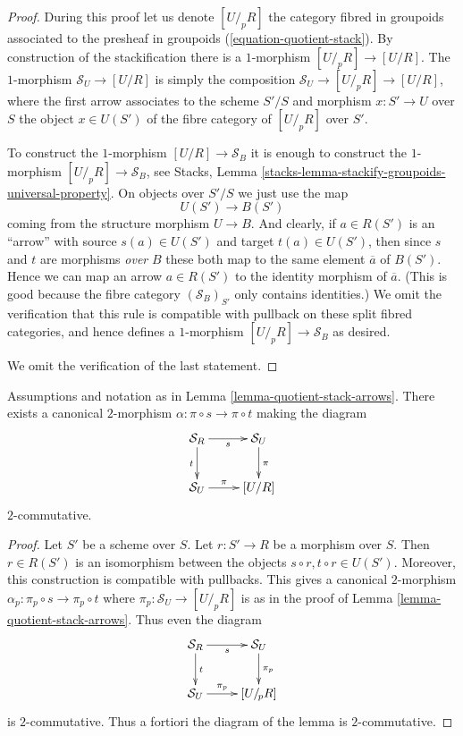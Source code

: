 \begin{proof}
During this proof let us denote $[U/_{\!p}R]$ the category fibred in
groupoids associated to the presheaf in groupoids
(\ref{equation-quotient-stack}). By construction of the stackification
there is a $1$-morphism $[U/_{\!p}R] \to [U/R]$.
The $1$-morphism $\mathcal{S}_U \to [U/R]$ is simply the composition
$\mathcal{S}_U \to [U/_{\!p}R] \to [U/R]$, where the first arrow
associates to the scheme $S'/S$ and morphism $x : S' \to U$ over $S$
the object $x \in U(S')$ of the fibre category of $[U/_{\!p}R]$
over $S'$.

\medskip\noindent
To construct the $1$-morphism $[U/R] \to \mathcal{S}_B$ it is enough to
construct the $1$-morphism $[U/_{\!p}R] \to \mathcal{S}_B$, see
Stacks, Lemma \ref{stacks-lemma-stackify-groupoids-universal-property}.
On objects over $S'/S$ we just use the map
$$
U(S') \longrightarrow B(S')
$$
coming from the structure morphism $U \to B$.
And clearly, if $a \in R(S')$ is an ``arrow'' with source
$s(a) \in U(S')$ and target $t(a) \in U(S')$, then since
$s$ and $t$ are morphisms {\it over} $B$ these both
map to the same element $\overline{a}$ of $B(S')$. Hence we can map an arrow
$a \in R(S')$ to the identity morphism of $\overline{a}$. (This is
good because the fibre category $(\mathcal{S}_B)_{S'}$ only contains
identities.) We omit the verification that this rule is compatible with
pullback on these split fibred categories, and hence defines a
$1$-morphism $[U/_{\!p}R] \to \mathcal{S}_B$ as desired.

\medskip\noindent
We omit the verification of the last statement.
\end{proof}

\begin{lemma}
\label{lemma-quotient-stack-2-arrow}
Assumptions and notation as in Lemma \ref{lemma-quotient-stack-arrows}.
There exists a canonical $2$-morphism
$\alpha : \pi \circ s \to \pi \circ t$ making the diagram
$$
\xymatrix{
\mathcal{S}_R \ar[r]_s \ar[d]_t & \mathcal{S}_U \ar[d]^\pi \\
\mathcal{S}_U \ar[r]^-\pi & [U/R]
}
$$
$2$-commutative.
\end{lemma}

\begin{proof}
Let $S'$ be a scheme over $S$. Let $r : S' \to R$ be a morphism over $S$.
Then $r \in R(S')$ is an isomorphism between the objects
$s \circ r, t \circ r \in U(S')$. Moreover, this construction is
compatible with pullbacks. This gives a canonical
$2$-morphism $\alpha_p : \pi_p \circ s \to \pi_p \circ t$
where $\pi_p : \mathcal{S}_U \to [U/_{\!p}R]$ is as in the
proof of
Lemma \ref{lemma-quotient-stack-arrows}. Thus even the diagram
$$
\xymatrix{
\mathcal{S}_R \ar[r]_s \ar[d]^t & \mathcal{S}_U \ar[d]^{\pi_p} \\
\mathcal{S}_U \ar[r]^-{\pi_p} & [U/_{\!p}R]
}
$$
is $2$-commutative. Thus a fortiori the diagram
of the lemma is $2$-commutative.
\end{proof}


